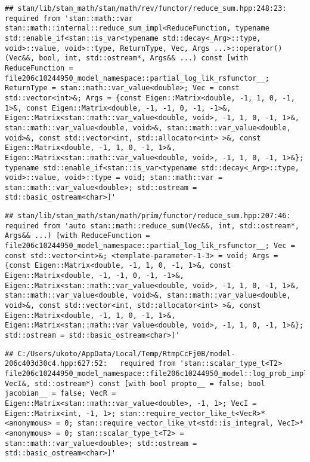 \documentclass[
]{article}
\begin{document}
\begin{verbatim}
## stan/lib/stan_math/stan/math/rev/functor/reduce_sum.hpp:248:23:   required from 'stan::math::var stan::math::internal::reduce_sum_impl<ReduceFunction, typename std::enable_if<stan::is_var<typename std::decay<_Arg>::type, void>::value, void>::type, ReturnType, Vec, Args ...>::operator()(Vec&&, bool, int, std::ostream*, Args&& ...) const [with ReduceFunction = file206c10244950_model_namespace::partial_log_lik_rsfunctor__; ReturnType = stan::math::var_value<double>; Vec = const std::vector<int>&; Args = {const Eigen::Matrix<double, -1, 1, 0, -1, 1>&, const Eigen::Matrix<double, -1, -1, 0, -1, -1>&, Eigen::Matrix<stan::math::var_value<double, void>, -1, 1, 0, -1, 1>&, stan::math::var_value<double, void>&, stan::math::var_value<double, void>&, const std::vector<int, std::allocator<int> >&, const Eigen::Matrix<double, -1, 1, 0, -1, 1>&, Eigen::Matrix<stan::math::var_value<double, void>, -1, 1, 0, -1, 1>&}; typename std::enable_if<stan::is_var<typename std::decay<_Arg>::type, void>::value, void>::type = void; stan::math::var = stan::math::var_value<double>; std::ostream = std::basic_ostream<char>]'
\end{verbatim}

\begin{verbatim}
## stan/lib/stan_math/stan/math/prim/functor/reduce_sum.hpp:207:46:   required from 'auto stan::math::reduce_sum(Vec&&, int, std::ostream*, Args&& ...) [with ReduceFunction = file206c10244950_model_namespace::partial_log_lik_rsfunctor__; Vec = const std::vector<int>&; <template-parameter-1-3> = void; Args = {const Eigen::Matrix<double, -1, 1, 0, -1, 1>&, const Eigen::Matrix<double, -1, -1, 0, -1, -1>&, Eigen::Matrix<stan::math::var_value<double, void>, -1, 1, 0, -1, 1>&, stan::math::var_value<double, void>&, stan::math::var_value<double, void>&, const std::vector<int, std::allocator<int> >&, const Eigen::Matrix<double, -1, 1, 0, -1, 1>&, Eigen::Matrix<stan::math::var_value<double, void>, -1, 1, 0, -1, 1>&}; std::ostream = std::basic_ostream<char>]'
\end{verbatim}

\begin{verbatim}
## C:/Users/ukoto/AppData/Local/Temp/RtmpCcFj0B/model-206c403d30c4.hpp:627:52:   required from 'stan::scalar_type_t<T2> file206c10244950_model_namespace::file206c10244950_model::log_prob_impl(VecR&, VecI&, std::ostream*) const [with bool propto__ = false; bool jacobian__ = false; VecR = Eigen::Matrix<stan::math::var_value<double>, -1, 1>; VecI = Eigen::Matrix<int, -1, 1>; stan::require_vector_like_t<VecR>* <anonymous> = 0; stan::require_vector_like_vt<std::is_integral, VecI>* <anonymous> = 0; stan::scalar_type_t<T2> = stan::math::var_value<double>; std::ostream = std::basic_ostream<char>]'
\end{verbatim}
\end{document}
